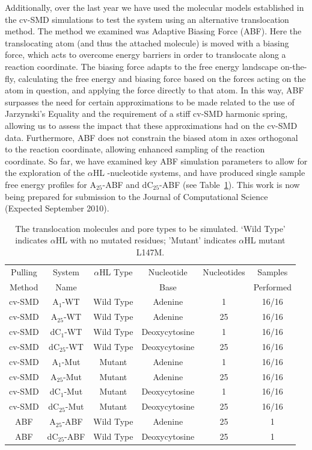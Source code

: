 \documentclass[a4paper,10pt]{article}
\newcommand{\dctfnsp}{dC$_{25}$}
\newcommand{\atfnsp}{A$_{25}$}
\newcommand{\dconsp}{dC$_{1}$}
\newcommand{\aonsp}{A$_{1}$}
\newcommand{\ahl}{$\alpha$HL }
\begin{document}
Additionally, over the last year we have used the molecular models established in the cv-SMD simulations to test the system using an alternative translocation method. The method we examined was Adaptive Biasing Force (ABF). Here the translocating atom (and thus the attached molecule) is moved with a biasing force, which acts to overcome energy barriers in order to translocate along a reaction coordinate. The biasing force adapts to the free energy landscape on-the-fly, calculating the free energy and biasing force based on the forces acting on the atom in question, and applying the force directly to that atom. In this way, ABF surpasses the need for certain approximations to be made related to the use of Jarzynski's Equality and the requirement of a stiff cv-SMD harmonic spring, allowing us to assess the impact that these approximations had on the cv-SMD data. Furthermore, ABF does not constrain the biased atom in axes orthogonal to the reaction coordinate, allowing enhanced sampling of the reaction coordinate. So far, we have examined key ABF simulation parameters to allow for the exploration of the \ahl-nucleotide systems, and have produced single sample free energy profiles for \atfnsp-ABF and \dctfnsp-ABF (see Table~\ref{table:systems1}). This work is now being prepared for submission to the Journal of Computational Science (Expected September 2010).

\begin{table}[!h]
\begin{center}
  \caption{The translocation molecules and pore types to be simulated. `Wild Type' indicates \ahl with no mutated residues; 'Mutant' indicates \ahl mutant L147M.\newline }
\label{table:systems1}
\begin{tabular}{| c | c | c | c | c | c |}
\hline
Pulling & System & \ahl Type & Nucleotide & Nucleotides & Samples \\
Method & Name &  & Base &  & Performed \\
\hline
cv-SMD & \aonsp-WT & Wild Type & Adenine & 1 & 16/16  \\
cv-SMD & \atfnsp-WT & Wild Type & Adenine & 25 & 16/16  \\
cv-SMD & \dconsp-WT & Wild Type & Deoxycytosine & 1 & 16/16  \\
cv-SMD & \dctfnsp-WT & Wild Type & Deoxycytosine & 25 & 16/16 \\
cv-SMD & \aonsp-Mut & Mutant & Adenine & 1 & 16/16  \\
cv-SMD & \atfnsp-Mut & Mutant & Adenine & 25 & 16/16  \\
cv-SMD & \dconsp-Mut & Mutant & Deoxycytosine & 1 & 16/16  \\
cv-SMD & \dctfnsp-Mut & Mutant & Deoxycytosine & 25 & 16/16  \\
ABF & \atfnsp-ABF & Wild Type & Adenine & 25 & 1  \\
ABF & \dctfnsp-ABF & Wild Type & Deoxycytosine & 25 & 1  \\
\hline
\end{tabular}
\end{center}
\end{table}
\end{document}
